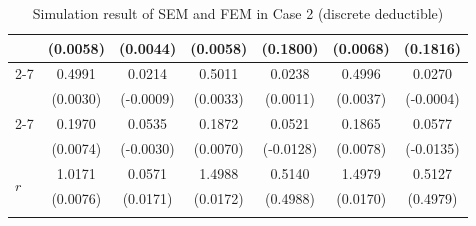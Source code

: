 \begin{table}[!ht]
{{\begin{minipage}{0.65\textwidth}
\begin{tabular}{lcccccc}
         & (0.0058) & (0.0044) & (0.0058) & (0.1800) & (0.0068) & (0.1816) \\
        \cmidrule{2-7}
         & 0.4991 & 0.0214 & 0.5011 & 0.0238 & 0.4996 & 0.0270 \\
         & (0.0030) & (-0.0009) & (0.0033) & (0.0011) & (0.0037) & (-0.0004) \\
        \cmidrule{2-7}
         & 0.1970 & 0.0535 & 0.1872 & 0.0521 & 0.1865 & 0.0577 \\
         & (0.0074) & (-0.0030) & (0.0070) & (-0.0128) & (0.0078) & (-0.0135) \\
        \midrule
        \multirow{2}{*}{$r$} & 1.0171 & 0.0571 & 1.4988 & 0.5140 & 1.4979 & 0.5127 \\
         & (0.0076) & (0.0171) & (0.0172) & (0.4988) & (0.0170) & (0.4979) \\
        \hhline{=======}
        \end{tabular}
    \end{minipage}
}
}
\caption{Simulation result of SEM and FEM in Case 2 (discrete deductible)}\label{tab:AppSimExoCase2}
\end{table}
